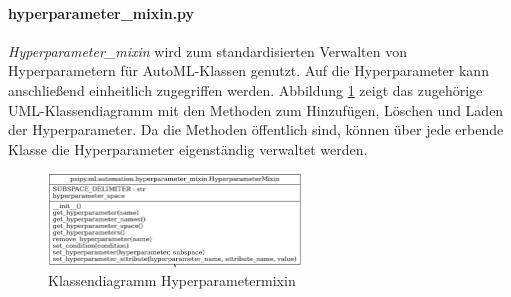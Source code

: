 	\paragraph{hyperparameter\_mixin.py}  \textit{Hyperparameter\_mixin} wird zum standardisierten Verwalten von Hyperparametern für AutoML-Klassen genutzt. Auf die Hyperparameter kann anschließend einheitlich zugegriffen werden. Abbildung \ref{img:KlassendiagrammHyperparametermixin} zeigt das zugehörige UML-Klassendiagramm mit den Methoden zum Hinzufügen, Löschen und Laden der Hyperparameter. Da die Methoden öffentlich sind, können über jede erbende Klasse die Hyperparameter eigenständig verwaltet werden.	
	\begin{figure}[h]
		\centering
		\includegraphics[width=0.6\textwidth, center]{bilder/Klassendiagramme/Hyperparametermixin.png}
		\caption[Klassendiagramm Hyperparametermixin]{Klassendiagramm Hyperparametermixin}
		\label{img:KlassendiagrammHyperparametermixin}
	\end{figure}  
	
